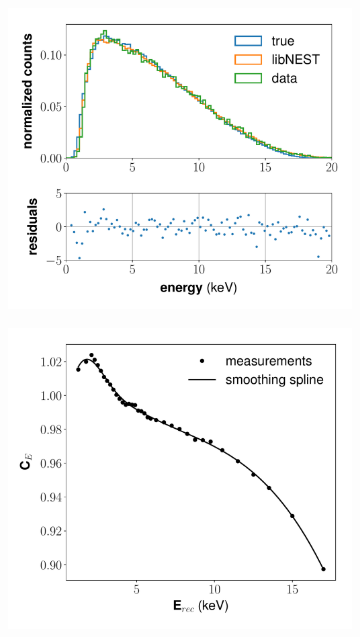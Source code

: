 \begin{figure}[h!]
\centering
\begin{subfigure}{0.45\textwidth}
  \centering
  \includegraphics[width=\textwidth]{Figures/yields_corrections/H3_spectrum_gfdcm_180Vcm_prelim.pdf}
  \caption{}
\end{subfigure}%
\begin{subfigure}{0.45\textwidth}
  \centering
  \includegraphics[width=\textwidth]{Figures/yields_corrections/H3_E_correction_gfdcm_180Vcm_prelim.pdf}

\end{subfigure}
\end{figure}
